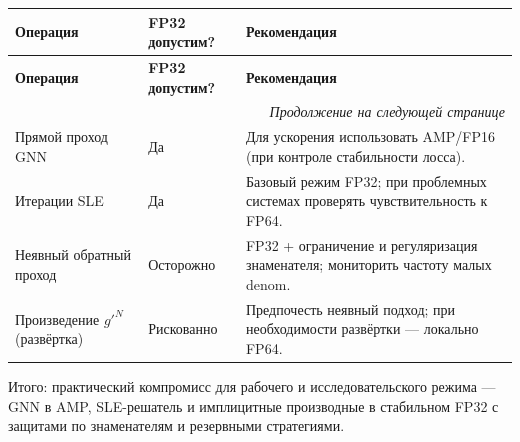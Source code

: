 \documentclass[11pt]{article}
\begin{document}
\begin{center}
\small
\begin{longtable}{|p{3.7cm}|p{2.3cm}|p{5.3cm}|}
\hline
\textbf{Операция} & \textbf{FP32 допустим?} & \textbf{Рекомендация} \\
\hline
\endfirsthead
\hline
\textbf{Операция} & \textbf{FP32 допустим?} & \textbf{Рекомендация} \\
\hline
\endhead
\hline
\multicolumn{3}{r}{\textit{Продолжение на следующей странице}} \\
\hline
\endfoot
\hline
\endlastfoot
Прямой проход GNN & Да & Для ускорения использовать AMP/FP16 (при контроле стабильности лосса). \\
\hline
Итерации SLE & Да & Базовый режим FP32; при проблемных системах проверять чувствительность к FP64. \\
\hline
Неявный обратный проход & Осторожно & FP32 + ограничение и регуляризация знаменателя; мониторить частоту малых denom. \\
\hline
Произведение $g'^N$ (развёртка) & Рискованно & Предпочесть неявный подход; при необходимости развёртки --- локально FP64. \\
\hline
\end{longtable}
\normalsize
\end{center}

Итого: практический компромисс для рабочего и исследовательского режима --- GNN в AMP, SLE-решатель и имплицитные производные в стабильном FP32 с защитами по знаменателям и резервными стратегиями.
\end{document}
